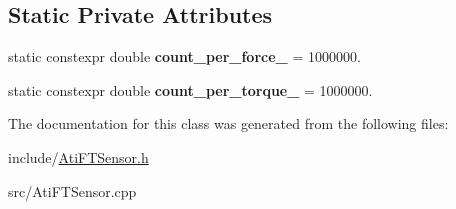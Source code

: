 \subsection*{Static Private Attributes}
\begin{DoxyCompactItemize}
\item 
static constexpr double {\bfseries count\+\_\+per\+\_\+force\+\_\+} = 1000000.\hypertarget{classati__ft__sensor_1_1AtiFTSensor_ad6a9362c8a68676e9c70857f1d0731ec}{}\label{classati__ft__sensor_1_1AtiFTSensor_ad6a9362c8a68676e9c70857f1d0731ec}

\item 
static constexpr double {\bfseries count\+\_\+per\+\_\+torque\+\_\+} = 1000000.\hypertarget{classati__ft__sensor_1_1AtiFTSensor_afe77e60a64a50e9e39c1099bfc33d908}{}\label{classati__ft__sensor_1_1AtiFTSensor_afe77e60a64a50e9e39c1099bfc33d908}

\end{DoxyCompactItemize}


The documentation for this class was generated from the following files\+:\begin{DoxyCompactItemize}
\item 
include/\hyperlink{AtiFTSensor_8h}{Ati\+F\+T\+Sensor.\+h}\item 
src/Ati\+F\+T\+Sensor.\+cpp\end{DoxyCompactItemize}
